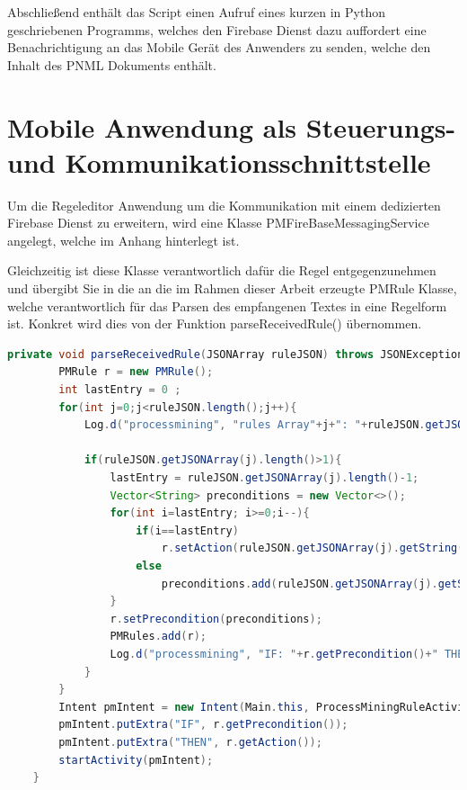 Abschließend enthält das Script einen Aufruf eines kurzen in Python geschriebenen Programms, welches den Firebase Dienst dazu auffordert eine Benachrichtigung an das Mobile Gerät des Anwenders zu senden, welche den Inhalt des PNML Dokuments enthält.

\section{Mobile Anwendung als Steuerungs- und Kommunikationsschnittstelle}

Um die Regeleditor Anwendung um die Kommunikation mit einem dedizierten Firebase Dienst zu erweitern, wird eine Klasse PMFireBaseMessagingService angelegt, welche im Anhang hinterlegt ist. 

Gleichzeitig ist diese Klasse verantwortlich dafür die Regel entgegenzunehmen und übergibt Sie in die an die im Rahmen dieser Arbeit erzeugte PMRule Klasse, welche verantwortlich für das Parsen des empfangenen Textes in eine Regelform ist. Konkret wird dies von der Funktion parseReceivedRule() übernommen.

\begin{lstlisting}[language=Java]
       private void parseReceivedRule(JSONArray ruleJSON) throws JSONException {
        PMRule r = new PMRule();
        int lastEntry = 0 ;
        for(int j=0;j<ruleJSON.length();j++){
            Log.d("processmining", "rules Array"+j+": "+ruleJSON.getJSONArray(j));

            if(ruleJSON.getJSONArray(j).length()>1){
                lastEntry = ruleJSON.getJSONArray(j).length()-1;
                Vector<String> preconditions = new Vector<>();
                for(int i=lastEntry; i>=0;i--){
                    if(i==lastEntry)
                        r.setAction(ruleJSON.getJSONArray(j).getString(i));
                    else
                        preconditions.add(ruleJSON.getJSONArray(j).getString(i));
                }
                r.setPrecondition(preconditions);
                PMRules.add(r);
                Log.d("processmining", "IF: "+r.getPrecondition()+" THEN: "+r.getAction());
            }
        }
        Intent pmIntent = new Intent(Main.this, ProcessMiningRuleActivity.class);
        pmIntent.putExtra("IF", r.getPrecondition());
        pmIntent.putExtra("THEN", r.getAction());
        startActivity(pmIntent);
    }
\end{lstlisting}

